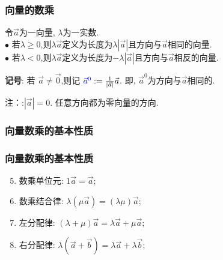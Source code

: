 \begin{frame}\frametitle{向量的数乘}
\begin{definition}[向量的数乘] 令$\vec{a}$为一向量, $\lambda$为一实数.\\
$\bullet$ 若$\lambda\geq0$,则$\lambda \vec{a}$定义为长度为$\lambda |\vec{a}|$且方向与$\vec{a}$相同的向量.\\
\pp
$\bullet$ 若$\lambda<0$,则$\lambda \vec{a}$定义为长度为$-\lambda |\vec{a}|$且方向与$\vec{a}$相反的向量.
\end{definition}
\pp

\textbf{记号}: 若 $\vec{a}\neq\vec{0}$,则记 $\blue{\vec{a}^0}:=\frac{1}{|\vec{a}|}\vec{a}$. 即, $\vec{a}^0$为方向与$\vec{a}$相同的.
\pp

注：:$|\vec{a}|=0$. 任意方向都为零向量的方向.
\end{frame}





\subsubsection{向量数乘的基本性质}
\begin{frame}\frametitle{向量数乘的基本性质}
\begin{proposition}[向量数乘的基本性质]
\pp
\begin{enumerate}\setcounter{enumi}{4}
\item 数乘单位元: $1\vec{a} = \vec{a}$;
\pp
\item 数乘结合律: $\lambda(\mu \vec{a})=(\lambda \mu)\vec{a}$;
\pp
\item 左分配律: $(\lambda+\mu)\vec{a}=\lambda \vec{a} + \mu \vec{a}$;
\pp
\item 右分配律: $\lambda (\vec{a}+\vec{b}) =\lambda \vec{a} + \lambda \vec{b}$;
\end{enumerate}
\end{proposition}
\end{frame}





